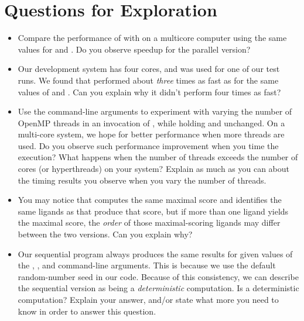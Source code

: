 \documentclass[letterpaper,10pt,openany,oneside]{sphinxmanual}
\begin{document}
\section{Questions for Exploration}
\label{openmp/openmp:questions-for-exploration}\begin{itemize}
\item {} 
Compare the performance of  with  on a multicore computer using the same values for  and . Do you observe speedup for the parallel version?

\item {} 
Our development system has four cores, and  was used for one of our test runs. We found that  performed about \emph{three} times as fast as  for the same values of  and . Can you explain why it didn’t perform four times as fast?

\item {} 
Use the command-line arguments to experiment with varying the number of OpenMP threads in an invocation of , while holding  and  unchanged. On a multi-core system, we hope for better performance when more threads are used. Do you observe such performance improvement when you time the execution? What happens when the number of threads exceeds the number of cores (or hyperthreads) on your system? Explain as much as you can about the timing results you observe when you vary the number of threads.

\item {} 
You may notice that  computes the same maximal score and identifies the same ligands as  that produce that score, but if more than one ligand yields the maximal score, the \emph{order} of those maximal-scoring ligands may differ between the two versions. Can you explain why?

\item {} 
Our sequential program  always produces the same results for given values of the , ,  and  command-line arguments. This is because we use the default random-number seed in our code. Because of this consistency, we can describe the sequential version as being a \emph{deterministic} computation. Is  a deterministic computation? Explain your answer, and/or state what more you need to know in order to answer this question.


\end{itemize}
\end{document}
